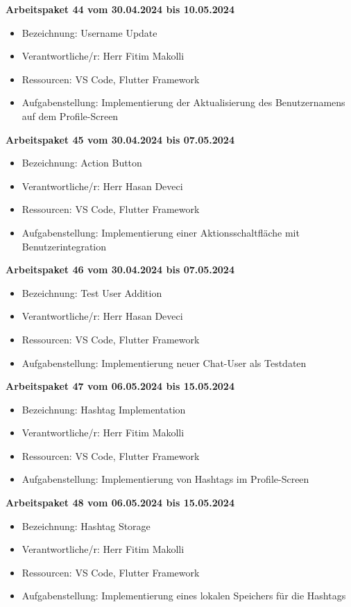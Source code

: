 \textbf{Arbeitspaket 44 vom 30.04.2024 bis 10.05.2024}
\begin{itemize}[itemsep=0pt]
    \item{Bezeichnung: Username Update} 
	\item{Verantwortliche/r: Herr Fitim Makolli} 
	\item{Ressourcen: VS Code, Flutter Framework} 
    \item{Aufgabenstellung: Implementierung der Aktualisierung des Benutzernamens auf dem Profile-Screen}
\end{itemize} 

\textbf{Arbeitspaket 45 vom 30.04.2024 bis 07.05.2024}
\begin{itemize}[itemsep=0pt]
    \item{Bezeichnung: Action Button} 
	\item{Verantwortliche/r: Herr Hasan Deveci} 
	\item{Ressourcen: VS Code, Flutter Framework} 
    \item{Aufgabenstellung: Implementierung einer Aktionsschaltfläche mit Benutzerintegration}
\end{itemize} 

\textbf{Arbeitspaket 46 vom 30.04.2024 bis 07.05.2024}
\begin{itemize}[itemsep=0pt]
    \item{Bezeichnung: Test User Addition} 
	\item{Verantwortliche/r: Herr Hasan Deveci} 
	\item{Ressourcen: VS Code, Flutter Framework} 
    \item{Aufgabenstellung: Implementierung neuer Chat-User als Testdaten}
\end{itemize} 

\textbf{Arbeitspaket 47 vom 06.05.2024 bis 15.05.2024}
\begin{itemize}[itemsep=0pt]
    \item{Bezeichnung: Hashtag Implementation} 
	\item{Verantwortliche/r: Herr Fitim Makolli} 
	\item{Ressourcen: VS Code, Flutter Framework} 
    \item{Aufgabenstellung: Implementierung von Hashtags im Profile-Screen}
\end{itemize} 

\textbf{Arbeitspaket 48 vom 06.05.2024 bis 15.05.2024}
\begin{itemize}[itemsep=0pt]
    \item{Bezeichnung: Hashtag Storage} 
	\item{Verantwortliche/r: Herr Fitim Makolli} 
	\item{Ressourcen: VS Code, Flutter Framework} 
    \item{Aufgabenstellung: Implementierung eines lokalen Speichers für die Hashtags}
\end{itemize} 

